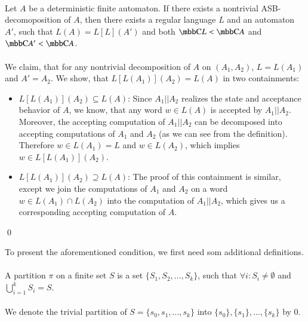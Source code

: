 \paragraph{}
\cveta Let $A$ be a deterministic finite automaton. If there exists a nontrivial ASB-decomoposition of $A$, then there exists a regular language $L$ and an automaton $A'$, such that $L(A) = L[L](A')$ and both $\C{L} < \C{A}$ and $\C{A'} < \C{A}$.

\paragraph{}
\dokaz We claim, that for any nontrivial decomposition of $A$ on $(A_1, A_2)$, $L=L(A_1)$ and $A'=A_2$. We show, that $L[L(A_1)](A_2)=L(A)$ in two containments:

\begin{itemize}
\item $L[L(A_1)](A_2)\subseteq L(A)$: Since $A_1 || A_2$ realizes the state and acceptance behavior of $A$, we know, that any word $w \in L(A)$ is accepted by $A_1 || A_2$. Moreover, the accepting computation of $A_1 || A_2$ can be decomposed into accepting computations of $A_1$ and $A_2$ (as we can see from the definition). Therefore $w \in L(A_1) = L$ and $w \in L(A_2)$, which implies $w \in L[L(A_1)](A_2)$.

\item $L[L(A_1)](A_2)\supseteq L(A)$: The proof of this containment is similar, except we join the computations of $A_1$ and $A_2$ on a word $w \in L(A_1) \cap L(A_2)$ into the computation of $A_1 || A_2$, which gives us a corresponding accepting computation of $A$.
\end{itemize} \qed

To present the aforementioned condition, we first need som additional definitions.

\paragraph{}
 A partition $\pi$ on a finite set $S$ is a set $\{S_1, S_2, ..., S_k\}$, such that $\forall i: S_i \neq \emptyset$ and $\bigcup_{i=1}^k S_i = S$.

\paragraph{}
\oznacenie We denote the trivial partition of $S=\{s_0, s_1,...,s_k\}$ into $\{s_0\},\{s_1\},...,\{s_k\}$ by $0$.

